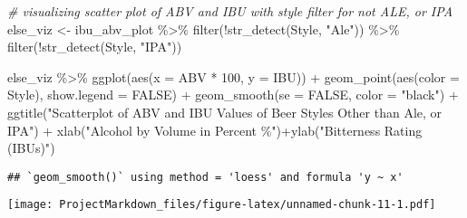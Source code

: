 \documentclass[
]{article}
\newenvironment{Shaded}{\begin{snugshade}}{\end{snugshade}}
\newcommand{\AttributeTok}[1]{\textcolor[rgb]{0.77,0.63,0.00}{#1}}
\newcommand{\CommentTok}[1]{\textcolor[rgb]{0.56,0.35,0.01}{\textit{#1}}}
\newcommand{\ConstantTok}[1]{\textcolor[rgb]{0.00,0.00,0.00}{#1}}
\newcommand{\DecValTok}[1]{\textcolor[rgb]{0.00,0.00,0.81}{#1}}
\newcommand{\FunctionTok}[1]{\textcolor[rgb]{0.00,0.00,0.00}{#1}}
\newcommand{\NormalTok}[1]{#1}
\newcommand{\OtherTok}[1]{\textcolor[rgb]{0.56,0.35,0.01}{#1}}
\newcommand{\SpecialCharTok}[1]{\textcolor[rgb]{0.00,0.00,0.00}{#1}}
\newcommand{\StringTok}[1]{\textcolor[rgb]{0.31,0.60,0.02}{#1}}
\begin{document}
\begin{Shaded}
\begin{Highlighting}[]
\CommentTok{\# visualizing scatter plot of ABV and IBU with style filter for not ALE, or IPA}
\NormalTok{else\_viz }\OtherTok{\textless{}{-}}\NormalTok{ ibu\_abv\_plot }\SpecialCharTok{\%\textgreater{}\%} \FunctionTok{filter}\NormalTok{(}\SpecialCharTok{!}\FunctionTok{str\_detect}\NormalTok{(Style, }\StringTok{"Ale"}\NormalTok{)) }\SpecialCharTok{\%\textgreater{}\%} \FunctionTok{filter}\NormalTok{(}\SpecialCharTok{!}\FunctionTok{str\_detect}\NormalTok{(Style, }\StringTok{"IPA"}\NormalTok{))}

\NormalTok{else\_viz }\SpecialCharTok{\%\textgreater{}\%} \FunctionTok{ggplot}\NormalTok{(}\FunctionTok{aes}\NormalTok{(}\AttributeTok{x =}\NormalTok{ ABV }\SpecialCharTok{*} \DecValTok{100}\NormalTok{, }\AttributeTok{y =}\NormalTok{ IBU)) }\SpecialCharTok{+}
  \FunctionTok{geom\_point}\NormalTok{(}\FunctionTok{aes}\NormalTok{(}\AttributeTok{color =}\NormalTok{ Style), }\AttributeTok{show.legend =} \ConstantTok{FALSE}\NormalTok{) }\SpecialCharTok{+}
  \FunctionTok{geom\_smooth}\NormalTok{(}\AttributeTok{se =} \ConstantTok{FALSE}\NormalTok{, }\AttributeTok{color =} \StringTok{"black"}\NormalTok{) }\SpecialCharTok{+} 
  \FunctionTok{ggtitle}\NormalTok{(}\StringTok{"Scatterplot of ABV and IBU Values of Beer Styles Other than Ale, or IPA"}\NormalTok{) }\SpecialCharTok{+} \FunctionTok{xlab}\NormalTok{(}\StringTok{"Alcohol by Volume in Percent \%"}\NormalTok{)}\SpecialCharTok{+}\FunctionTok{ylab}\NormalTok{(}\StringTok{"Bitterness Rating (IBUs)"}\NormalTok{)}
\end{Highlighting}
\end{Shaded}

\begin{verbatim}
## `geom_smooth()` using method = 'loess' and formula 'y ~ x'
\end{verbatim}

\texttt{[image: ProjectMarkdown\_files/figure-latex/unnamed-chunk-11-1.pdf]}
\end{document}
